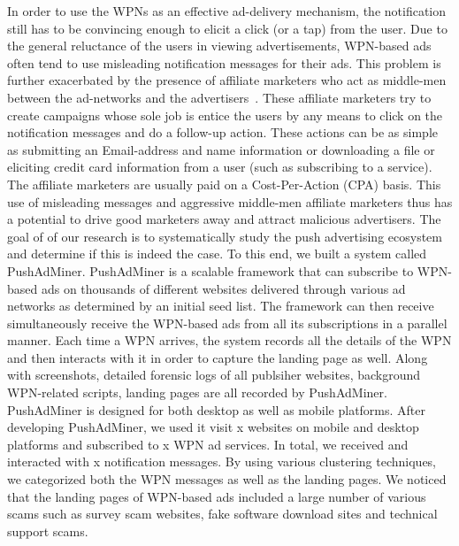 %
In order to use the WPNs as an effective ad-delivery mechanism, the notification still has to be convincing enough to elicit a click (or a tap) from the user. Due to the general reluctance of the users in viewing advertisements, WPN-based ads often tend to use misleading notification messages for their ads. This problem is further exacerbated by the presence of affiliate marketers who act as middle-men between the ad-networks and the advertisers~\cite{}. These affiliate marketers try to create campaigns whose sole job is entice the users by any means to click on the notification messages and do a follow-up action. These actions can be as simple as submitting an Email-address and name information or downloading a file or eliciting credit card information from a user (such as subscribing to a service). The affiliate marketers are usually paid on a Cost-Per-Action (CPA) basis. This use of misleading messages and aggressive middle-men affiliate marketers thus has a potential to drive good marketers away and attract malicious advertisers. The goal of of our research is to systematically study the push advertising ecosystem and determine if this is indeed the case. To this end, we built a system called PushAdMiner. PushAdMiner is a scalable framework that can subscribe to WPN-based ads on thousands of different websites delivered through various ad networks as determined by an initial seed list. The framework can then receive simultaneously receive the WPN-based ads from all its subscriptions in a parallel manner. Each time a WPN arrives, the system records all the details of the WPN and then interacts with it in order to capture the landing page as well. Along with screenshots, detailed forensic logs of all publsiher websites, background WPN-related scripts, landing pages are all recorded by PushAdMiner. PushAdMiner is designed for both desktop as well as mobile platforms. After developing PushAdMiner, we used it visit x websites on mobile and desktop platforms and subscribed to x WPN ad services. In total, we received and interacted with x notification messages. By using various clustering techniques, we categorized both the WPN messages as well as the landing pages. We noticed that the landing pages of WPN-based ads included a large number of various scams such as survey scam websites, fake software download sites and technical support scams.

